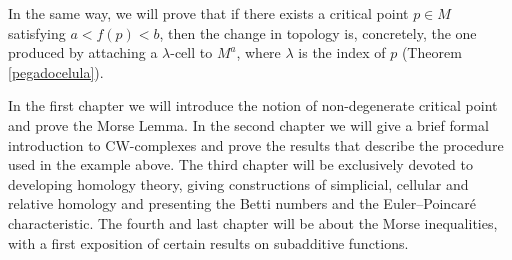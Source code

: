 In the same way, we will prove that if there exists a critical point $p\in M$ satisfying $a<f(p)<b$, then the change in topology is, concretely, the one produced by attaching a $\lambda$-cell to $M^a$, where $\lambda$ is the index of $p$ (Theorem \ref{pegadocelula}).

\medskip


In the first chapter we will introduce the notion of non-degenerate critical point and prove the Morse Lemma. In the second chapter we will give a brief formal introduction to CW-complexes and prove the results that describe the procedure used in the example above. The third chapter will be exclusively devoted to developing homology theory, giving constructions of simplicial, cellular and relative homology and presenting the Betti numbers and the Euler--Poincaré characteristic. The fourth and last chapter will be about the Morse inequalities, with a first exposition of certain results on subadditive functions.

